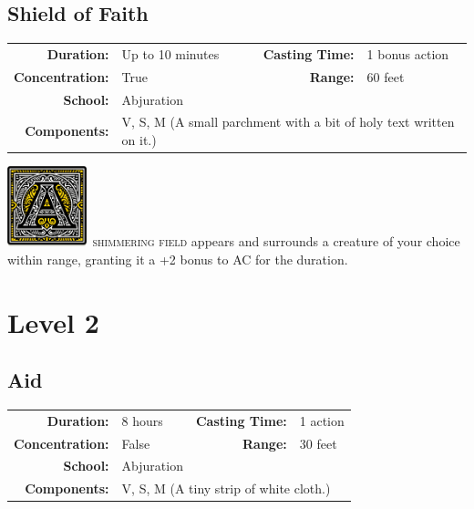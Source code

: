 \documentclass[12pt,showtrims]{memoir}
\begin{document}
\section*{Shield of Faith}

{
\small\centering\vspace{-6pt}
\begin{tabular}{rlrl}
\toprule

\textbf{Duration:} & U{\scriptsize p to 10 minutes} &
\textbf{Casting Time:} & 1 {\scriptsize bonus action} \\
\textbf{Concentration:} & True &
\textbf{Range:} & 60 feet \\
\textbf{School:} & Abjuration \\
\textbf{Components:} & \multicolumn{3}{p{0.7\textwidth}}{V, S, M (A small parchment with a bit of holy text written on it.)}\\

\bottomrule
\end{tabular}
}

\vspace{1\baselineskip}\noindent 
\lettrine[lines=4]{\includegraphics[height=66pt]{initials/A.png}}{\ shimmering field} appears and surrounds a creature of your choice within range, granting it a +2 bonus to AC for the duration.

\newpage
{}
\newpage
\chapter*{Level 2} 
\section*{Aid}

{
\small\centering\vspace{-6pt}
\begin{tabular}{rlrl}
\toprule

\textbf{Duration:} & 8 hours &
\textbf{Casting Time:} & 1 action \\
\textbf{Concentration:} & False &
\textbf{Range:} & 30 feet \\
\textbf{School:} & Abjuration \\
\textbf{Components:} & \multicolumn{3}{p{0.7\textwidth}}{V, S, M (A tiny strip of white cloth.)}\\

\bottomrule
\end{tabular}
}
\end{document}
